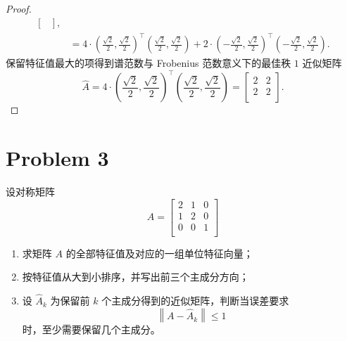 \begin{proof}
\[\begin{aligned}
\begin{bmatrix}
    \end{bmatrix}, \\
    &= \boxed{4 \cdot \left(\frac{\sqrt{2}}{2}, \frac{\sqrt{2}}{2}\right)^\top \left(\frac{\sqrt{2}}{2}, \frac{\sqrt{2}}{2}\right) + 2 \cdot \left(-\frac{\sqrt{2}}{2}, \frac{\sqrt{2}}{2}\right)^\top \left(-\frac{\sqrt{2}}{2}, \frac{\sqrt{2}}{2}\right)}.
\end{aligned}
\]
保留特征值最大的项得到谱范数与 Frobenius 范数意义下的最佳秩 $1$ 近似矩阵 \[\hat{A} = 4 \cdot \left(\frac{\sqrt{2}}{2}, \frac{\sqrt{2}}{2}\right)^\top \left(\frac{\sqrt{2}}{2}, \frac{\sqrt{2}}{2}\right) = \boxed{\begin{bmatrix}
    2 & 2 \\
    2 & 2 \\
\end{bmatrix}}.
\]

\end{proof}
\section*{Problem 3}

设对称矩阵 \[
A = \begin{bmatrix}
    2 & 1 & 0 \\
    1 & 2 & 0 \\
    0 & 0 & 1 \\
\end{bmatrix}
\]
\begin{enumerate}
    \item 求矩阵 $A$ 的全部特征值及对应的一组单位特征向量；
    \item 按特征值从大到小排序，并写出前三个主成分方向；
    \item 设 $\hat{A}_k$ 为保留前 $k$ 个主成分得到的近似矩阵，判断当误差要求 \[\left\|A - \hat{A}_k\right\| \le 1\] 时，至少需要保留几个主成分。
\end{enumerate}

